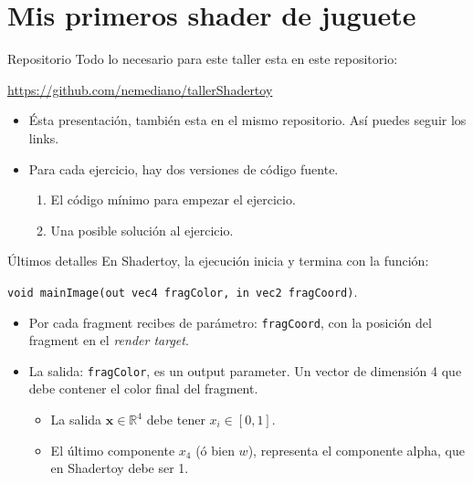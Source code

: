 \section{Mis primeros shader de juguete}
\begin{frame}{Repositorio}
Todo lo necesario para este taller esta en este repositorio: 
\begin{block}{}
\url{https://github.com/nemediano/tallerShadertoy}
\end{block}
\begin{itemize}
    \item Ésta presentación, también esta en el mismo repositorio. Así puedes seguir los links.
    \item Para cada ejercicio, hay dos versiones de código fuente.
    \begin{enumerate}
        \item El código mínimo para empezar el ejercicio.
        \item Una posible solución al ejercicio.
    \end{enumerate}
\end{itemize}

\end{frame}

\begin{frame}{Últimos detalles}
En Shadertoy, la ejecución inicia y termina con la función:

\texttt{void mainImage(out vec4 fragColor, in vec2 fragCoord)}.

\begin{itemize}
    \item Por cada fragment recibes de parámetro: \texttt{fragCoord}, con la posición del fragment en el \emph{render target}.
    \item La salida: \texttt{fragColor}, es un output parameter. Un vector de dimensión 4 que debe contener el color final del fragment.
    \begin{itemize}
        \item La salida $\mathbf{x} \in \mathbb{R}^{4}$ debe tener $ x_i \in [0, 1]$.
        \item El último componente $x_4$ (ó bien $w$), representa el componente alpha, que en Shadertoy debe ser 1.
    \end{itemize}
\end{itemize}
\end{frame}

